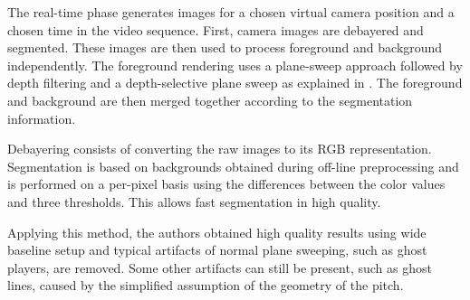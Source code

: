 The real-time phase generates images for a chosen virtual camera position and a chosen time in the video sequence.
First, camera images are debayered and segmented. These images are then used to process foreground and background independently.
The foreground rendering uses a plane-sweep approach followed by depth filtering and a depth-selective plane sweep 
as explained in \cite{05_plane_sweeping}.
The foreground and background are then merged together according to the segmentation information.

Debayering consists of converting the raw images to its RGB representation.
Segmentation is based on backgrounds obtained during off-line preprocessing and is performed on a per-pixel basis using
the differences between the color values and three thresholds.
This allows fast segmentation in high quality.


Applying this method, the authors obtained high quality results using wide baseline setup and typical artifacts of normal plane sweeping, 
such as ghost players, are removed.
Some other artifacts can still be present, such as ghost lines, caused by the simplified assumption of the geometry of the pitch.
